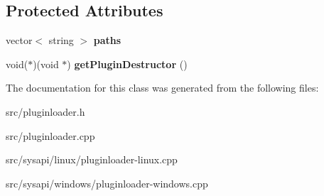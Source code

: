 \subsection*{\-Protected \-Attributes}
\begin{DoxyCompactItemize}
\item 
\hypertarget{classpluginLoader__t_ac88063905690333ba2739df33bdd878f}{vector$<$ string $>$ {\bfseries paths}}\label{classpluginLoader__t_ac88063905690333ba2739df33bdd878f}

\item 
\hypertarget{classpluginLoader__t_afecd85a838efca38c2a720338b2be45c}{void($\ast$)(void $\ast$) {\bfseries get\-Plugin\-Destructor} ()}\label{classpluginLoader__t_afecd85a838efca38c2a720338b2be45c}

\end{DoxyCompactItemize}


\-The documentation for this class was generated from the following files\-:\begin{DoxyCompactItemize}
\item 
src/pluginloader.\-h\item 
src/pluginloader.\-cpp\item 
src/sysapi/linux/pluginloader-\/linux.\-cpp\item 
src/sysapi/windows/pluginloader-\/windows.\-cpp\end{DoxyCompactItemize}
